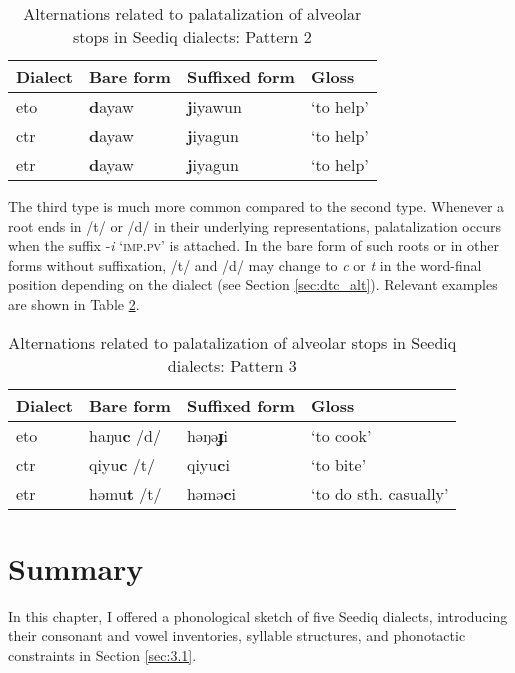 \begin{table}[!htbp]
\centering
\caption{Alternations related to palatalization of alveolar stops in Seediq dialects: Pattern 2}
\label{tab:cjtd_alt_2}
\begin{tabular}{llll}
\hline
Dialect   & Bare form & Suffixed form & Gloss     \\ \hline
\acl{eto} & \textbf{d}ayaw     & \textbf{j}iyawun      & `to help' \\
\acl{ctr} & \textbf{d}ayaw     & \textbf{j}iyagun      & `to help' \\
\acl{etr} & \textbf{d}ayaw     & \textbf{j}iyagun      & `to help' \\ \hline
\end{tabular}
\end{table}

The third type is much more common compared to the second type. Whenever a root ends in /t/ or /d/ in their underlying representations, palatalization occurs when the suffix -\textit{i} `\textsc{imp.pv}' is attached. In the bare form of such roots or in other forms without suffixation, /t/ and /d/ may change to \textit{c} or \textit{t} in the word-final position depending on the dialect (see Section \ref{sec:dtc_alt}). Relevant examples are shown in Table \ref{tab:cjtd_alt_3}.

\begin{table}[!htbp]
\centering
\caption{Alternations related to palatalization of alveolar stops in Seediq dialects: Pattern 3}
\label{tab:cjtd_alt_3}
\begin{tabular}{llll}
\hline
Dialect   & Bare form & Suffixed form & Gloss                 \\ \hline
\acl{eto} & haŋu\textbf{c} /d/    & həŋə\textbf{ɟ}i       & `to cook'             \\
\acl{ctr} & qiyu\textbf{c} /t/    & qiyu\textbf{c}i       & `to bite'             \\
\acl{etr} & həmu\textbf{t} /t/    & həmə\textbf{c}i       & `to do sth. casually' \\ \hline
\end{tabular}
\end{table}

\section{Summary}

In this chapter, I offered a phonological sketch of five Seediq dialects, introducing their consonant and vowel inventories, syllable structures, and phonotactic constraints in Section \ref{sec:3.1}. 

